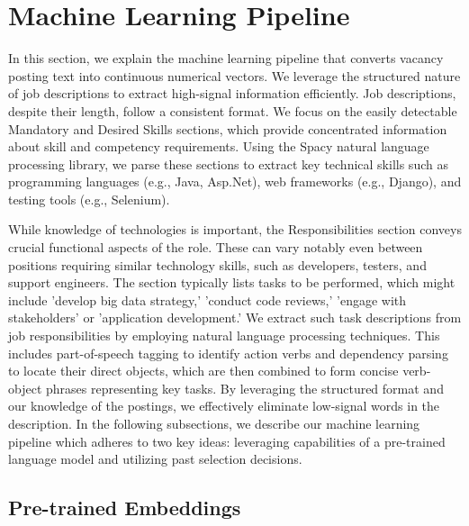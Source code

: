 
\section{Machine Learning Pipeline}\label{sec:machine_learning_pipeline}

In this section, we explain the machine learning pipeline that converts vacancy posting text into continuous numerical 
vectors. We leverage the structured nature of job descriptions to extract high-signal information efficiently. Job 
descriptions, despite their length, follow a consistent format. We focus on the easily detectable Mandatory and 
Desired Skills sections, which provide concentrated information about skill and competency requirements. Using the 
Spacy natural language processing library, we parse these sections to extract key technical skills such as programming 
languages (e.g., Java, Asp.Net), web frameworks (e.g., Django), and testing tools (e.g., Selenium).

While knowledge of technologies is important, the Responsibilities section conveys crucial functional aspects of the 
role. These can vary notably even between positions requiring similar technology skills, such as developers, testers, 
and support engineers. The section typically lists tasks to be performed, which might include 'develop big data strategy,' 
'conduct code reviews,' 'engage with stakeholders' or 'application development.' We extract such task descriptions from 
job responsibilities by employing natural language processing techniques. This includes part-of-speech tagging to identify 
action verbs and dependency parsing to locate their direct objects, which are then combined to form concise verb-object 
phrases representing key tasks. By leveraging the structured format and our knowledge of the postings, we effectively 
eliminate low-signal words in the description. In the following subsections, we describe our machine learning pipeline 
which adheres to two key ideas: leveraging capabilities of a pre-trained language model and utilizing past selection 
decisions. 

\subsection{Pre-trained Embeddings}

